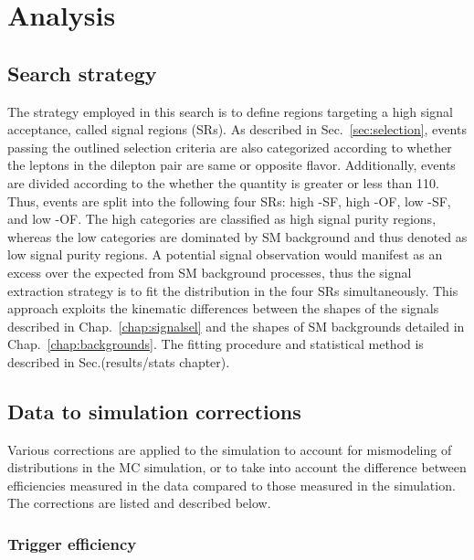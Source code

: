 \chapter{Analysis}
\label{chap:analysis}

\section{Search strategy}
\label{sec:strategy}

The strategy employed in this search is to define regions targeting a high signal acceptance, called signal regions (SRs). As described in Sec.~\ref{sec:selection}, events passing the outlined selection criteria are also categorized according to whether the leptons in the dilepton pair are same or opposite flavor. Additionally, events are divided according to the whether the \mttll quantity is greater or less than 110\:\GeV. Thus, events are split into the following four SRs: high \mttll-SF, high \mttll-OF, low \mttll-SF, and low \mttll-OF. The high \mttll categories are classified as high signal purity regions, whereas the low \mttll categories are dominated by SM \ttll background and thus denoted as low signal purity regions. A potential signal observation would manifest as an excess over the expected \ptmiss from SM background processes, thus the signal extraction strategy is to fit the \ptmiss distribution in the four SRs simultaneously. This approach exploits the kinematic differences between the \ptmiss shapes of the \ttDM signals described in Chap.~\ref{chap:signalsel} and the \ptmiss shapes of SM backgrounds detailed in Chap.~\ref{chap:backgrounds}. The fitting procedure and statistical method is described in Sec.(results/stats chapter). 

\section{Data to simulation corrections}

Various corrections are applied to the simulation to account for mismodeling of distributions in the MC simulation, or to take into account the difference between efficiencies measured in the data compared to those measured in the simulation. The corrections are listed and described below.

\subsection{Trigger efficiency}
\label{subsec:trigger}
